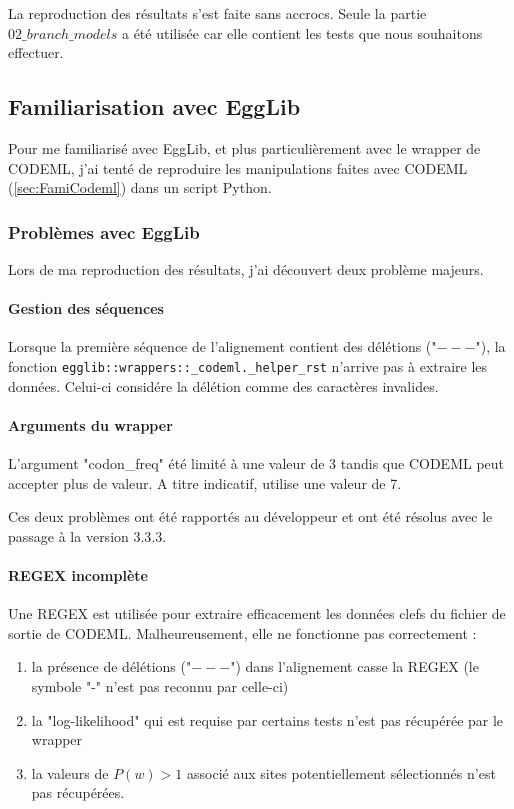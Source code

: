 \documentclass[../main]{subfiles} %
\begin{document}
La reproduction des résultats s'est faite sans accrocs. Seule la partie $02\_branch\_models$ a été utilisée car elle contient les tests que nous souhaitons effectuer.


\subsection{Familiarisation avec  \gls{EggLib}}

Pour me familiarisé avec \gls{EggLib}, et plus particulièrement avec le \gls{wrapper} de  \gls{CODEML}, j'ai tenté de reproduire les manipulations faites avec \gls{CODEML} (\cref{sec:FamiCodeml}) dans un script \gls{Python}.

\subsubsection{Problèmes avec \gls{EggLib}}
Lors de ma reproduction des résultats, j'ai découvert deux problème majeurs.

\paragraph{Gestion des séquences} Lorsque la première séquence de l'alignement contient des délétions ("$---$"), la fonction \lstinline {egglib::wrappers::_codeml._helper_rst} n'arrive pas à extraire les données. Celui-ci considére la délétion comme des caractères invalides.

\paragraph{Arguments du \gls{wrapper}} L'argument "codon\_freq" été limité à une valeur de 3 tandis que \gls{CODEML} peut accepter plus de valeur. A titre indicatif, \cite{alvarez-carretero_beginners_2023} utilise une valeur de 7. 

\vspace{1em}
Ces deux problèmes ont été rapportés au développeur et ont été résolus avec le passage à la version $3.3.3$.

\paragraph{\acrshort{REGEX} incomplète}
Une \acrshort{REGEX} est utilisée pour extraire efficacement les données clefs du fichier de sortie de \gls{CODEML}. Malheureusement, elle ne fonctionne pas correctement :

\begin{enumerate}
    \item la présence de délétions ("$---$") dans l'alignement casse la \acrshort{REGEX} (le symbole "-" n'est pas reconnu par celle-ci)
    \item la "log-likelihood" qui est requise par certains tests n'est pas récupérée par le \gls{wrapper}
    \item la valeurs de $P(w)>1$ associé aux sites potentiellement sélectionnés n'est pas récupérées.
\end{enumerate}
\end{document}
